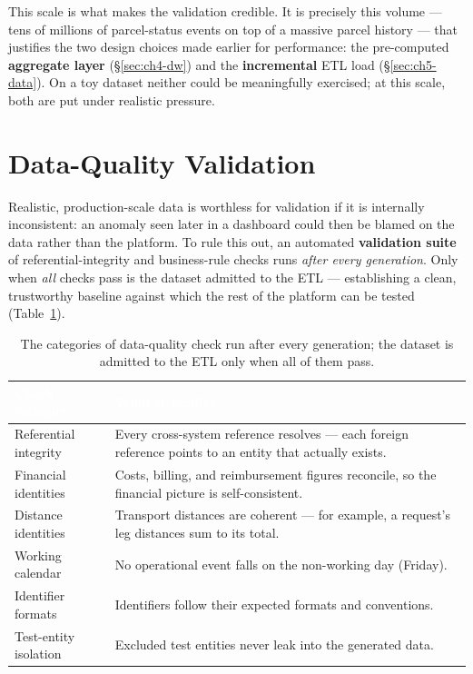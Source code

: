 This scale is what makes the validation credible. It is precisely this volume --- tens of millions of
parcel-status events on top of a massive parcel history --- that justifies the two design choices made
earlier for performance: the pre-computed \textbf{aggregate layer} (\S\ref{sec:ch4-dw}) and the
\textbf{incremental} ETL load (\S\ref{sec:ch5-data}). On a toy dataset neither could be meaningfully
exercised; at this scale, both are put under realistic pressure.

\section{Data-Quality Validation}
\label{sec:ch6-quality}

Realistic, production-scale data is worthless for validation if it is internally inconsistent: an
anomaly seen later in a dashboard could then be blamed on the data rather than the platform. To rule
this out, an automated \textbf{validation suite} of referential-integrity and business-rule checks runs
\emph{after every generation}. Only when \emph{all} checks pass is the dataset admitted to the ETL ---
establishing a clean, trustworthy baseline against which the rest of the platform can be tested
(Table~\ref{tab:ch6-quality}).

\begin{table}[H]
\centering
\caption{The categories of data-quality check run after every generation; the dataset is admitted to the
ETL only when all of them pass.}
\label{tab:ch6-quality}
\renewcommand{\arraystretch}{1.35}
\begin{tabularx}{\linewidth}{|>{\raggedright\arraybackslash}p{3.9cm}|>{\raggedright\arraybackslash}X|}
\hline
\rowcolor{tblheader}
\textcolor{white}{\textbf{Check category}} & \textcolor{white}{\textbf{What it verifies}} \\
\hline
Referential integrity & Every cross-system reference resolves --- each foreign reference points to an
entity that actually exists. \\
Financial identities & Costs, billing, and reimbursement figures reconcile, so the financial picture is
self-consistent. \\
Distance identities & Transport distances are coherent --- for example, a request's leg distances sum to
its total. \\
Working calendar & No operational event falls on the non-working day (Friday). \\
Identifier formats & Identifiers follow their expected formats and conventions. \\
Test-entity isolation & Excluded test entities never leak into the generated data. \\
\hline
\end{tabularx}
\end{table}

